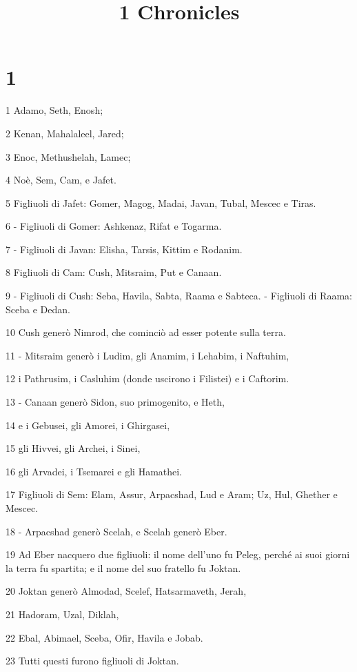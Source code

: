 

\title{1 Chronicles}


\chapter{1}

\par 1 Adamo, Seth, Enosh;
\par 2 Kenan, Mahalaleel, Jared;
\par 3 Enoc, Methushelah, Lamec;
\par 4 Noè, Sem, Cam, e Jafet.
\par 5 Figliuoli di Jafet: Gomer, Magog, Madai, Javan, Tubal, Mescec e Tiras.
\par 6 - Figliuoli di Gomer: Ashkenaz, Rifat e Togarma.
\par 7 - Figliuoli di Javan: Elisha, Tarsis, Kittim e Rodanim.
\par 8 Figliuoli di Cam: Cush, Mitsraim, Put e Canaan.
\par 9 - Figliuoli di Cush: Seba, Havila, Sabta, Raama e Sabteca. - Figliuoli di Raama: Sceba e Dedan.
\par 10 Cush generò Nimrod, che cominciò ad esser potente sulla terra.
\par 11 - Mitsraim generò i Ludim, gli Anamim, i Lehabim, i Naftuhim,
\par 12 i Pathrusim, i Casluhim (donde uscirono i Filistei) e i Caftorim.
\par 13 - Canaan generò Sidon, suo primogenito, e Heth,
\par 14 e i Gebusei, gli Amorei, i Ghirgasei,
\par 15 gli Hivvei, gli Archei, i Sinei,
\par 16 gli Arvadei, i Tsemarei e gli Hamathei.
\par 17 Figliuoli di Sem: Elam, Assur, Arpacshad, Lud e Aram; Uz, Hul, Ghether e Mescec.
\par 18 - Arpacshad generò Scelah, e Scelah generò Eber.
\par 19 Ad Eber nacquero due figliuoli: il nome dell'uno fu Peleg, perché ai suoi giorni la terra fu spartita; e il nome del suo fratello fu Joktan.
\par 20 Joktan generò Almodad, Scelef, Hatsarmaveth, Jerah,
\par 21 Hadoram, Uzal, Diklah,
\par 22 Ebal, Abimael, Sceba, Ofir, Havila e Jobab.
\par 23 Tutti questi furono figliuoli di Joktan.

